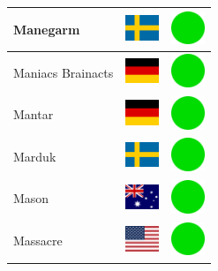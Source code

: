 \documentclass[12pt, a4paper, twoside]{report}
\begin{document}
\begin{center}
\begin{longtable}{|p{5cm}|p{2cm}|p{2cm}|}
Manegarm & \includegraphics[width=1cm]{4x3/se} & \includegraphics[width=1cm]{likes/y} \\ \hline
Maniacs Brainacts & \includegraphics[width=1cm]{4x3/de} & \includegraphics[width=1cm]{likes/y} \\ \hline
Mantar & \includegraphics[width=1cm]{4x3/de} & \includegraphics[width=1cm]{likes/y} \\ \hline
Marduk & \includegraphics[width=1cm]{4x3/se} & \includegraphics[width=1cm]{likes/y} \\ \hline
Mason & \includegraphics[width=1cm]{4x3/au} & \includegraphics[width=1cm]{likes/y} \\ \hline
Massacre & \includegraphics[width=1cm]{4x3/us} & \includegraphics[width=1cm]{likes/y} \\ \hline

\end{longtable}
\end{center}
\end{document}
